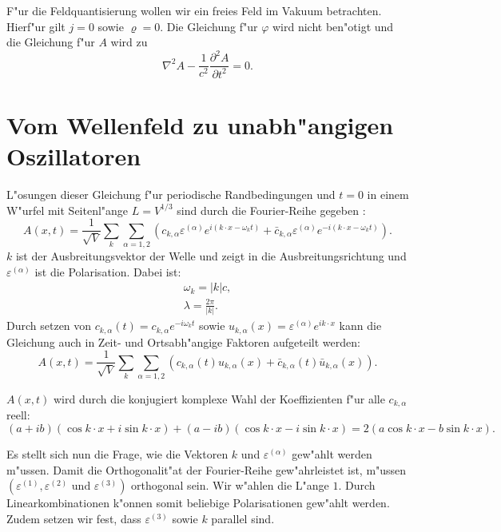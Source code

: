 F"ur die Feldquantisierung wollen wir ein freies Feld im Vakuum betrachten. Hierf"ur gilt $j = 0$ sowie $\varrho = 0$.
Die Gleichung f"ur $\varphi$ wird nicht ben"otigt und die Gleichung f"ur $A$ wird zu
\begin{equation} \label{fq:wave_dgl}
\nabla^2 A - \frac{1}{c^2} \frac{\partial^2 A }{\partial t^2} = 0.
\end{equation}

\section{Vom Wellenfeld zu unabh"angigen Oszillatoren}
L"osungen dieser Gleichung f"ur periodische Randbedingungen und $t=0$ in einem W"urfel mit Seitenl"ange $L = V^{1/3}$ sind durch die Fourier-Reihe gegeben \cite{fq:em_wave_eq}:
\begin{equation} \label{fq:wave_eq}
A(x,t) = \frac{1}{\sqrt{V}} \sum_k \sum_{\alpha=1,2} \left(c_{k,\alpha} \varepsilon^{(\alpha)} e^{i (k \cdot x - \omega_k t)} + \bar{c}_{k,\alpha} \varepsilon^{(\alpha)} e^{-i(k \cdot x - \omega_k t)}\right).
\end{equation}
$k$ ist der Ausbreitungsvektor der Welle und zeigt in die Ausbreitungsrichtung und $\varepsilon^{(\alpha)}$ ist die Polarisation. Dabei ist:
\begin{align*}
\omega_k=|k|c, \\
\lambda = \frac{2 \pi}{|k|}.
\end{align*}
Durch setzen von $c_{k,\alpha}(t) = c_{k,\alpha} e^{-i \omega_k t}$ sowie $u_{k,\alpha}(x) = \varepsilon^{(\alpha)} e^{ik \cdot x}$ kann die Gleichung auch in Zeit- und Ortsabh"angige Faktoren aufgeteilt werden:
\begin{equation*}
A(x,t) = \frac{1}{\sqrt{V}} \sum_k \sum_{\alpha=1,2} \left(c_{k,\alpha}(t)u_{k,\alpha}(x) + \bar{c}_{k,\alpha}(t) \bar{u}_{k,\alpha}(x) \right).
\end{equation*}

$A(x,t)$ wird durch die konjugiert komplexe Wahl der Koeffizienten f"ur alle $c_{k,\alpha}$ reell:
\begin{equation*}
(a + ib)(\cos k \cdot x + i \sin k \cdot x ) + (a - ib)(\cos k \cdot x - i \sin k \cdot x ) = 2 ( a \cos k \cdot x - b \sin k \cdot x ).
\end{equation*}

Es stellt sich nun die Frage, wie die Vektoren $k$ und $\varepsilon^{(\alpha)}$ gew"ahlt werden m"ussen. Damit die Orthogonalit"at der Fourier-Reihe gew"ahrleistet ist, m"ussen $(\varepsilon^{(1)}, \varepsilon^{(2)} \text{ und } \varepsilon^{(3)})$ orthogonal sein. Wir w"ahlen die L"ange $1$. Durch Linearkombinationen k"onnen somit beliebige Polarisationen gew"ahlt werden. Zudem setzen wir fest, dass $\varepsilon^{(3)}$ sowie $k$ parallel sind.

